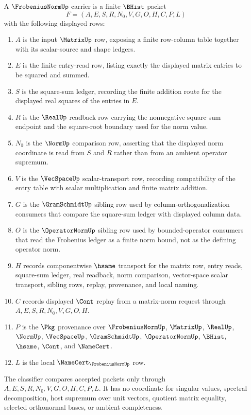 \begin{definition}
\label{def:frobenius-norm-carrier}
A $\FrobeniusNormUp$ carrier is a finite $\BHist$ packet
$$
F=(A,E,S,R,N_0,V,G,O,H,C,P,L)
$$
with the following displayed rows:
\begin{enumerate}
\item $A$ is the input $\MatrixUp$ row, exposing a finite row-column table together with its scalar-source and shape ledgers.
\item $E$ is the finite entry-read row, listing exactly the displayed matrix entries to be squared and summed.
\item $S$ is the square-sum ledger, recording the finite addition route for the displayed real squares of the entries in $E$.
\item $R$ is the $\RealUp$ readback row carrying the nonnegative square-sum endpoint and the square-root boundary used for the norm value.
\item $N_0$ is the $\NormUp$ comparison row, asserting that the displayed norm coordinate is read from $S$ and $R$ rather than from an ambient operator supremum.
\item $V$ is the $\VecSpaceUp$ scalar-transport row, recording compatibility of the entry table with scalar multiplication and finite matrix addition.
\item $G$ is the $\GramSchmidtUp$ sibling row used by column-orthogonalization consumers that compare the square-sum ledger with displayed column data.
\item $O$ is the $\OperatorNormUp$ sibling row used by bounded-operator consumers that read the Frobenius ledger as a finite norm bound, not as the defining operator norm.
\item $H$ records componentwise $\hsame$ transport for the matrix row, entry reads, square-sum ledger, real readback, norm comparison, vector-space scalar transport, sibling rows, replay, provenance, and local naming.
\item $C$ records displayed $\Cont$ replay from a matrix-norm request through $A,E,S,R,N_0,V,G,O,H$.
\item $P$ is the $\Pkg$ provenance over $\FrobeniusNormUp$, $\MatrixUp$, $\RealUp$, $\NormUp$, $\VecSpaceUp$, $\GramSchmidtUp$, $\OperatorNormUp$, $\BHist$, $\hsame$, $\Cont$, and $\NameCert$.
\item $L$ is the local $\NameCert_{\FrobeniusNormUp}$ row.
\end{enumerate}
The classifier compares accepted packets only through $A,E,S,R,N_0,V,G,O,H,C,P,L$. It has no coordinate for singular values, spectral decomposition, host supremum over unit vectors, quotient matrix equality, selected orthonormal bases, or ambient completeness.
\end{definition}

